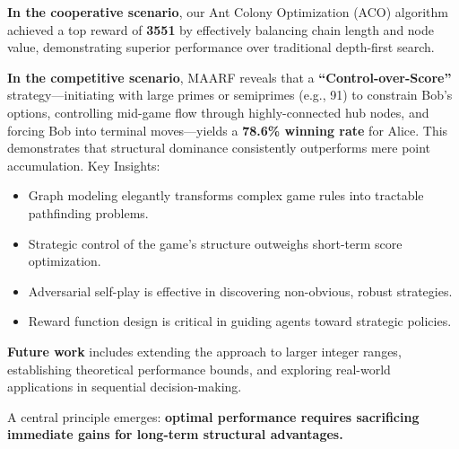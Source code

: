 \documentclass[twocolumn, a4paper]{article}
\begin{document}
\textbf{In the cooperative scenario}, our Ant Colony Optimization (ACO) algorithm achieved a top reward of \textbf{3551} by effectively balancing chain length and node value, demonstrating superior performance over traditional depth-first search.

\textbf{In the competitive scenario}, MAARF reveals that a \textbf{``Control-over-Score''} strategy—initiating with large primes or semiprimes (e.g., 91) to constrain Bob's options, controlling mid-game flow through highly-connected hub nodes, and forcing Bob into terminal moves—yields a \textbf{78.6\% winning rate} for Alice. This demonstrates that structural dominance consistently outperforms mere point accumulation.
Key Insights:
\begin{itemize}
  \item Graph modeling elegantly transforms complex game rules into tractable pathfinding problems.
  \item Strategic control of the game's structure outweighs short-term score optimization.
  \item Adversarial self-play is effective in discovering non-obvious, robust strategies.
  \item Reward function design is critical in guiding agents toward strategic policies.
\end{itemize}
\textbf{Future work} includes extending the approach to larger integer ranges, establishing theoretical performance bounds, and exploring real-world applications in sequential decision-making.

A central principle emerges: \textbf{optimal performance requires sacrificing immediate gains for long-term structural advantages.}



\end{document}
